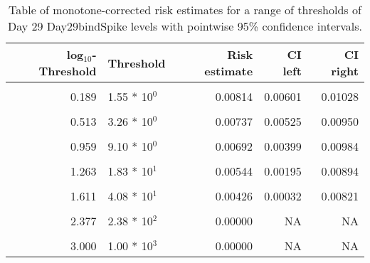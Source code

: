 \documentclass[]{article}
\begin{document}
\begin{table}[!h]

\caption{\label{tab:unnamed-chunk-26}Table of monotone-corrected risk estimates for a range of thresholds of Day 29 Day29bindSpike levels with pointwise 95\% confidence intervals.}
\centering
\begin{tabular}[t]{rlrrr}
\toprule
log$_{10}$-Threshold & Threshold & Risk estimate & CI left & CI right\\
\midrule
\cellcolor{gray!6}{-0.813} & \cellcolor{gray!6}{1.54 * 10$^{1}$} & \cellcolor{gray!6}{0.00857} & \cellcolor{gray!6}{0.00656} & \cellcolor{gray!6}{0.01058}\\
0.189 & 1.55 * 10$^{0}$ & 0.00814 & 0.00601 & 0.01028\\
\cellcolor{gray!6}{0.341} & \cellcolor{gray!6}{2.19 * 10$^{0}$} & \cellcolor{gray!6}{0.00797} & \cellcolor{gray!6}{0.00584} & \cellcolor{gray!6}{0.01009}\\
0.513 & 3.26 * 10$^{0}$ & 0.00737 & 0.00525 & 0.00950\\
\cellcolor{gray!6}{0.792} & \cellcolor{gray!6}{6.19 * 10$^{0}$} & \cellcolor{gray!6}{0.00723} & \cellcolor{gray!6}{0.00483} & \cellcolor{gray!6}{0.00963}\\
0.959 & 9.10 * 10$^{0}$ & 0.00692 & 0.00399 & 0.00984\\
\cellcolor{gray!6}{1.113} & \cellcolor{gray!6}{1.30 * 10$^{1}$} & \cellcolor{gray!6}{0.00613} & \cellcolor{gray!6}{0.00277} & \cellcolor{gray!6}{0.00948}\\
1.263 & 1.83 * 10$^{1}$ & 0.00544 & 0.00195 & 0.00894\\
\cellcolor{gray!6}{1.491} & \cellcolor{gray!6}{3.10 * 10$^{1}$} & \cellcolor{gray!6}{0.00426} & \cellcolor{gray!6}{0.00080} & \cellcolor{gray!6}{0.00773}\\
1.611 & 4.08 * 10$^{1}$ & 0.00426 & 0.00032 & 0.00821\\
\cellcolor{gray!6}{1.729} & \cellcolor{gray!6}{5.36 * 10$^{1}$} & \cellcolor{gray!6}{0.00348} & \cellcolor{gray!6}{0.00039} & \cellcolor{gray!6}{0.00658}\\
2.377 & 2.38 * 10$^{2}$ & 0.00000 & NA & NA\\
\cellcolor{gray!6}{2.699} & \cellcolor{gray!6}{5.00 * 10$^{2}$} & \cellcolor{gray!6}{0.00000} & \cellcolor{gray!6}{NA} & \cellcolor{gray!6}{NA}\\
3.000 & 1.00 * 10$^{3}$ & 0.00000 & NA & NA\\
\bottomrule
\end{tabular}
\end{table}
\end{document}
